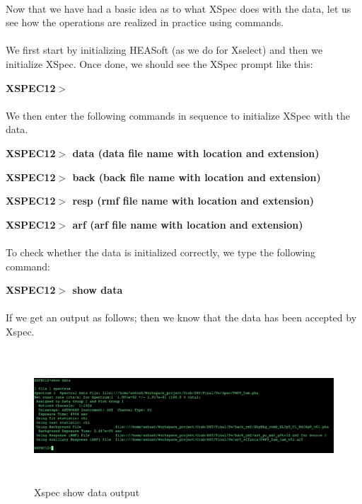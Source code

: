 \documentclass[a4paper,twoside]{report}
\numberwithin{equation}{section}
\begin{document}
\paragraph{}
Now that we have had a basic idea as to what XSpec does with the data, let us see how the operations are realized in practice using commands. 
\paragraph{}
We first start by initializing HEASoft (as we do for Xselect) and then we initialize XSpec. Once done, we should see the XSpec prompt like this:
\begin{center}
\item \large \textbf{XSPEC12$>$}
\end{center}
\paragraph{}
We then enter the following commands in sequence to initialize XSpec with the data. 
\begin{center}
\item \large \textbf{XSPEC12$>$ data (data file name with location and extension)}
\item \large \textbf{XSPEC12$>$ back (back file name with location and extension)}
\item \large \textbf{XSPEC12$>$ resp (rmf file name with location and extension)}
\item \large \textbf{XSPEC12$>$ arf (arf file name with location and extension)}
\end{center}
\paragraph{}
To check whether the data is initialized correctly, we type the following command:
\begin{center}
\item \large \textbf{XSPEC12$>$ show data}
\end{center}
\paragraph{}
If we get an output as follows; then we know that the data has been accepted by Xspec.
\begin{figure}[h]
\includegraphics[width=1.0\linewidth, height=5cm]{xspec_sd.jpg}
\caption{Xspec show data output}
\label{Xspec_show_data}
\end{figure}
\end{document}
